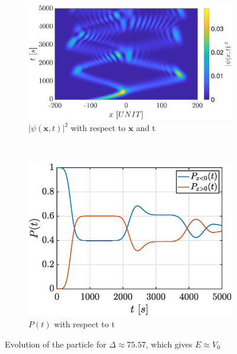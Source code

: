 \documentclass[a4paper,12pt,twoside]{article}
\newcommand{\mbf}[1]{\mathbf{#1}} %
\begin{document}
\begin{figure}[h]
  \centering
  \begin{subfigure}[t]{0.45\textwidth}
    \includegraphics[width=\textwidth]{graphs/iii_evo_E=v0_psi.eps}
    \caption{$|\psi(\mbf{x}, t)|^2$ with respect to $\mbf{x}$ and t}
    \label{fig:iii_evo_E=v0_psi}
  \end{subfigure}
  ~
  \begin{subfigure}[t]{0.45\textwidth}
    \includegraphics[width=\textwidth]{graphs/iii_evo_E=v0_prob.eps}
    \caption{$P(t)$ with respect to t}
    \label{fig:iii_evo_E=v0_prob}
  \end{subfigure}
  \caption{Evolution of the particle for $\Delta \approx 75.57$, which gives $E \approx V_0$}
  \label{fig:iii_evo_E=v0}
\end{figure}
\end{document}

